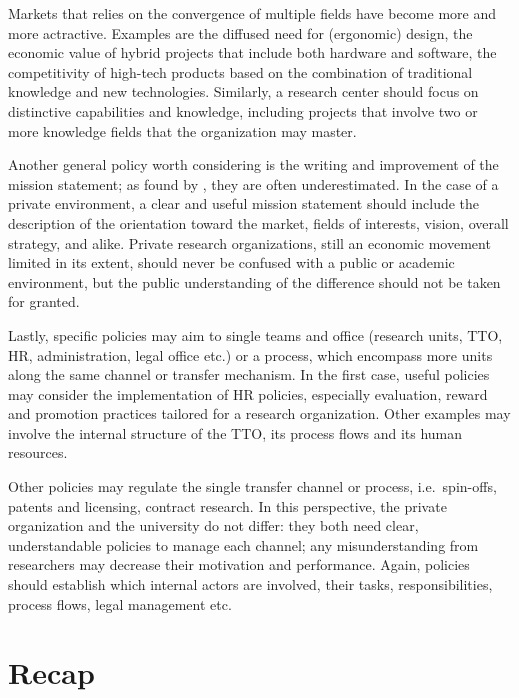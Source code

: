 Markets that relies on the convergence of multiple fields have become more and more actractive. Examples are the diffused need for (ergonomic) design, the economic value of hybrid projects that include both hardware and software, the competitivity of high-tech products based on the combination of traditional knowledge and new technologies. Similarly, a research center should focus on distinctive capabilities and knowledge, including projects that involve two or more knowledge fields that the organization may master. 
 
Another general policy worth considering is the writing and improvement of the mission statement; as found by \citet{Fitzgerald2015}, they are often underestimated. In the case of a private environment, a clear and useful mission statement should include the description of the orientation toward the market, fields of interests, vision, overall strategy, and alike. Private research organizations, still an economic movement limited in its extent, should never be confused with a public or academic environment, but the public understanding of the difference should not be taken for granted. 

Lastly, specific policies may aim to single teams and office (research units, TTO, HR, administration, legal office etc.) or a process, which encompass more units along the same channel or transfer mechanism. In the first case, useful policies may consider the implementation of HR policies, especially evaluation, reward and promotion practices tailored for a research organization. Other examples may involve the internal structure of the TTO, its process flows and its human resources.

Other policies may regulate the single transfer channel or process, i.e.\ spin-offs, patents and licensing, contract research. In this perspective, the private organization and the university do not differ: they both need clear, understandable policies to manage each channel; any misunderstanding from researchers may decrease their motivation and performance. Again, policies should establish which internal actors are involved, their tasks, responsibilities, process flows, legal management etc.

\section{Recap}